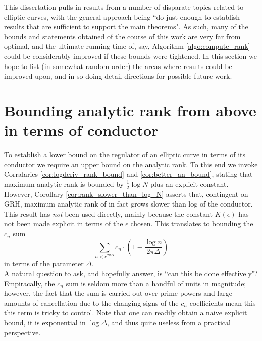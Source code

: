 
This dissertation pulls in results from a number of disparate topics related to elliptic curves, with the general approach being ``do just enough to establish results that are sufficient to support the main theorems". As such, many of the bounds and statements obtained of the course of this work are very far from optimal, and the ultimate running time of, say, Algorithm \ref{algo:compute_rank} could be considerably improved if these bounds were tightened. In this section we hope to list (in somewhat random order) the areas where results could be improved upon, and in so doing detail directions for possible future work.

\section{Bounding analytic rank from above in terms of conductor}

To establish a lower bound on the regulator of an elliptic curve in terms of its conductor we require an upper bound on the analytic rank. To this end we invoke Corralaries \ref{cor:logderiv_rank_bound} and \ref{cor:better_an_bound}, stating that maximum analytic rank is bounded by $\frac{1}{2}\log N$ plus an explicit constant. \\

However, Corollary \ref{cor:rank_slower_than_log_N} asserts that, contingent on GRH, maximum analytic rank of in fact grows slower than log of the conductor. This result has {\it not} been used directly, mainly because the constant $K(\epsilon)$ has not been made explicit in terms of the $\epsilon$ chosen. This translates to bounding the $c_n$ sum
\begin{equation}
\sum_{n < e^{2\pi \Delta}} c_n \cdot \left(1-\frac{\log n}{2\pi \Delta}\right)
\end{equation}
in terms of the parameter $\Delta$. \\

A natural question to ask, and hopefully answer, is ``can this be done effectively"? Empiracally, the $c_n$ sum is seldom more than a handful of units in magnitude; however, the fact that the sum is carried out over prime powers and large amounts of cancellation due to the changing signs of the $c_n$ coefficients mean this this term is tricky to control. Note that one can readily obtain a naive explicit bound, it is exponential in $\log \Delta$, and thus quite useless from a practical perspective. \\

